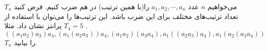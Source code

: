     \p 
می‌خواهیم
$n$
عدد
$a_1, a_2, \cdots, a_n$
 را(با همین ترتیب) در هم ضرب کنیم. فرض کنید
$T_n$
تعداد ترتیب‌های مختلف برای این ضرب باشد. این ترتیب‌ها را می‌توان با استفاده از پرانتز نشان داد. مثلا
$T_4 = 5$
.
$$((a_1a_2)a_3)a_4, (a_1(a_2a_3))a_4, (a_1a_2)(a_3a_4), a_1((a_2a_3)a_4), a_1(a_2(a_3a_4))$$
$T_n$
را بیابید.